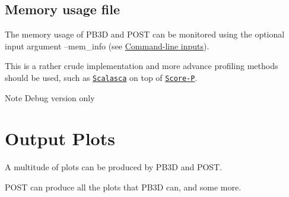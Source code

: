 \hypertarget{page_outputs_output_file_mem}{}\subsection{Memory usage file}\label{page_outputs_output_file_mem}
The memory usage of P\+B3D and P\+O\+ST can be monitored using the optional input argument {\ttfamily --mem\+\_\+info} (see \hyperlink{page_inputs_inputs_PB3D_cmd}{Command-\/line inputs}).

This is a rather crude implementation and more advance profiling methods should be used, such as \href{http://www.scalasca.org/}{\tt Scalasca} on top of \href{http://www.vi-hps.org/projects/score-p/}{\tt Score-\/P}.

\begin{DoxyNote}{Note}
Debug version only
\end{DoxyNote}
\hypertarget{page_outputs_output_plots}{}\section{Output Plots}\label{page_outputs_output_plots}
A multitude of plots can be produced by P\+B3D and P\+O\+ST.

P\+O\+ST can produce all the plots that P\+B3D can, and some more.

